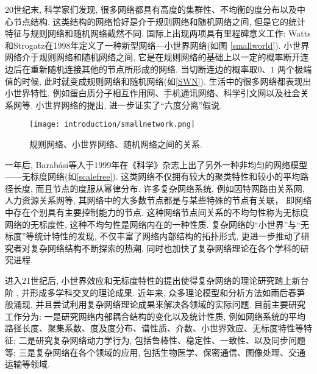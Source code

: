 20世纪末, 科学家们发现, 很多网络都具有高度的集群性、不均衡的度分布以及中心节点结构. 这类结构的网络恰好是介于规则网络和随机网络之间, 但是它的统计特征与规则网络和随机网络截然不同. 国际上出现两项具有里程碑意义工作: Watts 和Strogatz在1998年定义了一种新型网络—小世界网络(如图 \ref{smallworld}). 小世界网络介于规则网络和随机网络之间, 它是在规则网络的基础上以一定的概率断开连边后在重新随机连接其他的节点所形成的网络. 当切断连边的概率取$0$、$1$ 两个极端值的时候, 此时就变成规则网络和随机网络(如\autoref{SWN}). 生活中的很多网络都表现出小世界特性, 例如蛋白质分子相互作用网、手机通讯网络、科学引文网以及社会关系网等. 小世界网络的提出, 进一步证实了“六度分离”假说.

\begin{figure}[htb]
  \center
  \texttt{[image: introduction/smallnetwork.png]}\\
  \caption{规则网络、小世界网络、随机网络之间的关系.}\label{SWN}
\end{figure}

一年后, Barabási等人于1999年在《科学》杂志上出了另外一种非均匀的网络模型——无标度网络(如\autoref{scalefree}). 这类网络不仅拥有较大的聚类特性和较小的平均路径长度, 而且节点的度服从幂律分布. 许多复杂网络系统, 例如因特网路由关系网, 人力资源关系网等, 其网络中的大多数节点都是与某些特殊的节点有关联， 即网络中存在个别具有主要控制能力的节点. 这种网络节点间关系的不均匀性称为无标度网络的无标度性, 这种不均匀性是网络内在的一种性质.
复杂网络的“小世界”与“无标度”等统计特性的发现, 不仅丰富了网络内部结构的拓扑形式, 更进一步推动了研究者对复杂网络结构不断探索的热潮, 同时也加快了复杂网络理论在各个学科的研究进程.

进入21世纪后, 小世界效应和无标度特性的提出使得复杂网络的理论研究踏上新台阶 , 并形成多学科交叉的理论成果. 近年来, 众多理论模型和分析方法如雨后春笋般涌现, 并且尝试利用复杂网络理论成果来解决各领域的实际问题. 目前主要研究工作分为: 一是研究网络内部耦合结构的变化以及统计性质, 例如网络系统的平均路径长度、聚集系数、度及度分布、谱性质、介数、小世界效应、无标度特性等特征; 二是研究复杂网络动力学行为, 包括鲁棒性、稳定性、一致性、以及同步问题等; 三是复杂网络在各个领域的应用, 包括生物医学、保密通信、图像处理、交通运输等领域.


